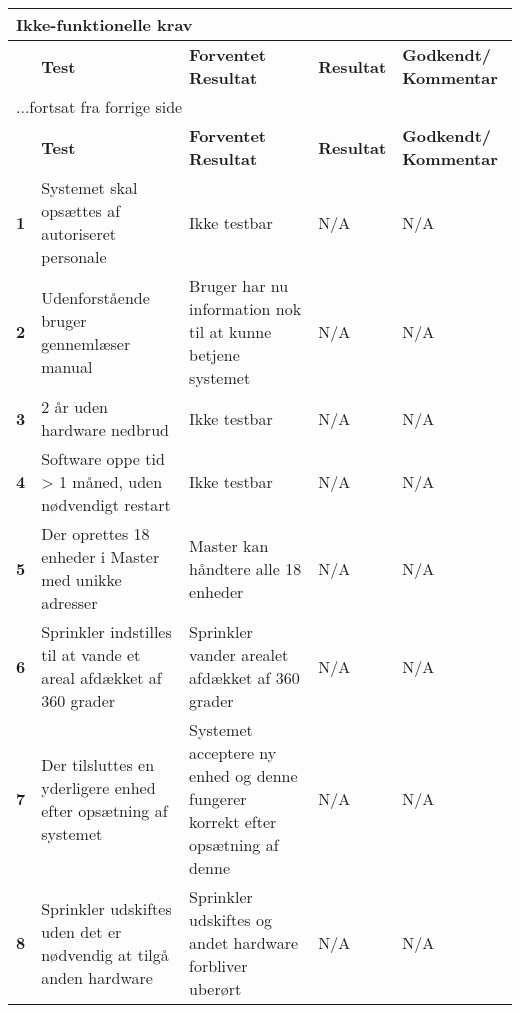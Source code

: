 \begin{center}
\begin{longtable}{|p{}|p{}|p{}|p{}|p{}|} %
\hline
\multicolumn{5}{|l|}{\textbf{Ikke-funktionelle krav}} \\ \hline
\multicolumn{1}{|c|}{} &
\textbf{Test} &
\textbf{Forventet \newline Resultat} &
\textbf{Resultat} &
\textbf{Godkendt/ \newline Kommentar} \\ \hline 
\endfirsthead

\multicolumn{5}{l}{...fortsat fra forrige side} \\ \hline 
\multicolumn{1}{|c|}{} &
\textbf{Test} &
\textbf{Forventet \newline Resultat} &
\textbf{Resultat} &
\textbf{Godkendt/ \newline Kommentar} \\ \hline 
\endhead

\textbf{1}	&Systemet skal opsættes af autoriseret personale
			&Ikke testbar
			&N/A
			&N/A \\ \hline 
			
\textbf{2}	&Udenforstående bruger gennemlæser manual
			&Bruger har nu information nok til at kunne betjene systemet
			&N/A
			&N/A \\ \hline 
			
\textbf{3}	&2 år uden hardware nedbrud
			&Ikke testbar
			&N/A
			&N/A \\ \hline 
			
\textbf{4}	&Software oppe tid > 1 måned, uden nødvendigt restart
			&Ikke testbar
			&N/A
			&N/A \\ \hline 
			
\textbf{5}	&Der oprettes 18 enheder i Master med unikke adresser
			&Master kan håndtere alle 18 enheder
			&N/A
			&N/A \\ \hline 
			
\textbf{6}	&Sprinkler indstilles til at vande et areal afdækket af 360 grader
			&Sprinkler vander arealet afdækket af 360 grader
			&N/A
			&N/A \\ \hline 
			
\textbf{7}	&Der tilsluttes en yderligere enhed efter opsætning af systemet
			&Systemet acceptere ny enhed og denne fungerer korrekt efter opsætning af denne
			&N/A
			&N/A \\ \hline 
			
\textbf{8}	&Sprinkler udskiftes uden det er nødvendig at tilgå anden hardware
			&Sprinkler udskiftes og andet hardware forbliver uberørt
			&N/A
			&N/A \\ \hline 
			

\end{longtable}
\end{center}
